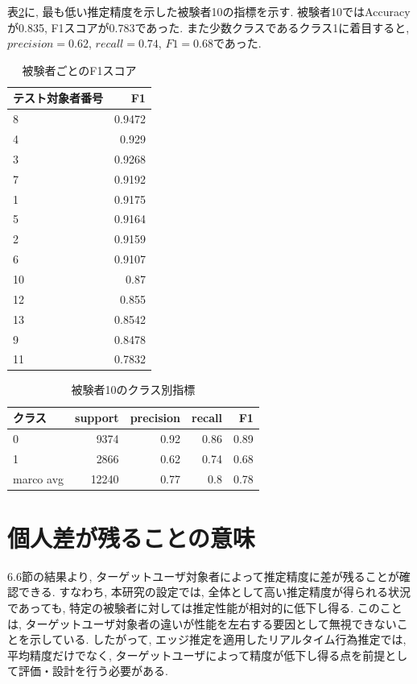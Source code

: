\documentclass[a4paper,12pt]{jreport}
\begin{document}
表\ref{tab:test10_F1}に, 最も低い推定精度を示した被験者10の指標を示す. 被験者10ではAccuracyが0.835, F1スコアが0.783であった. また少数クラスであるクラス1に着目すると, $precision=0.62$, $recall=0.74$, $F1=0.68$であった.  

\begin{table}[tb]
  \centering
  \caption{被験者ごとのF1スコア}
  \label{tab:test_F1}
  \renewcommand{\arraystretch}{1.2}
  \small
  \begin{tabular}{|l|r|}
    \hline
    テスト対象者番号 & F1 \\ \hline
8 & 0.9472 \\ \hline
4 & 0.929 \\ \hline
3 & 0.9268 \\ \hline
7 & 0.9192 \\ \hline
1 & 0.9175 \\ \hline
5 & 0.9164 \\ \hline
2 & 0.9159 \\ \hline
6 & 0.9107 \\ \hline
10 & 0.87 \\ \hline
12 & 0.855 \\ \hline
13 & 0.8542 \\ \hline
9 & 0.8478 \\ \hline
11 & 0.7832 \\ \hline
  \end{tabular}
\end{table}

\begin{table}[tb]
  \centering
  \caption{被験者10のクラス別指標}
  \label{tab:test10_F1}
  \renewcommand{\arraystretch}{1.2}
  \small
  \begin{tabular}{|l|r|r|r|r|}
    \hline
   クラス & support & precision & recall & F1 \\ \hline
0 & 9374 & 0.92 & 0.86 & 0.89 \\ \hline
1 & 2866 & 0.62 & 0.74 & 0.68 \\ \hline
marco avg & 12240 & 0.77 & 0.8 & 0.78 \\ \hline
  \end{tabular}
\end{table}

\section{個人差が残ることの意味}
6.6節の結果より, ターゲットユーザ対象者によって推定精度に差が残ることが確認できる. すなわち, 本研究の設定では, 全体として高い推定精度が得られる状況であっても, 特定の被験者に対しては推定性能が相対的に低下し得る. このことは, ターゲットユーザ対象者の違いが性能を左右する要因として無視できないことを示している. したがって, エッジ推定を適用したリアルタイム行為推定では, 平均精度だけでなく, ターゲットユーザによって精度が低下し得る点を前提として評価・設計を行う必要がある. 
\end{document}
